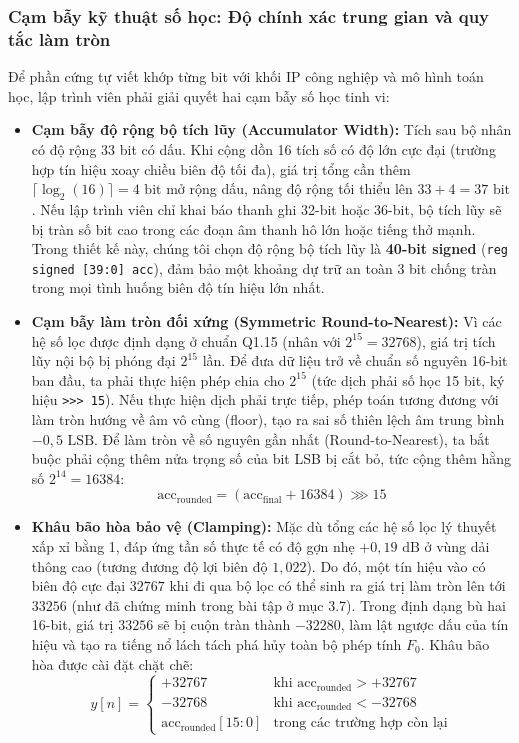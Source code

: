 \subsubsection*{Cạm bẫy kỹ thuật số học: Độ chính xác trung gian và quy tắc làm tròn}
Để phần cứng tự viết khớp từng bit với khối IP công nghiệp và mô hình toán học, lập trình viên phải giải quyết hai cạm bẫy số học tinh vi:
\begin{itemize}[leftmargin=1.5em, itemsep=3pt]
    \item \textbf{Cạm bẫy độ rộng bộ tích lũy (Accumulator Width):} 
    Tích sau bộ nhân có độ rộng 33 bit có dấu. Khi cộng dồn 16 tích số có độ lớn cực đại (trường hợp tín hiệu xoay chiều biên độ tối đa), giá trị tổng cần thêm $\lceil \log_2(16) \rceil = 4\text{ bit}$ mở rộng dấu, nâng độ rộng tối thiểu lên $33 + 4 = 37\text{ bit}$. Nếu lập trình viên chỉ khai báo thanh ghi 32-bit hoặc 36-bit, bộ tích lũy sẽ bị tràn số bit cao trong các đoạn âm thanh hô lớn hoặc tiếng thở mạnh. Trong thiết kế này, chúng tôi chọn độ rộng bộ tích lũy là \textbf{40-bit signed} (\texttt{reg signed [39:0] acc}), đảm bảo một khoảng dự trữ an toàn 3 bit chống tràn trong mọi tình huống biên độ tín hiệu lớn nhất.
    \item \textbf{Cạm bẫy làm tròn đối xứng (Symmetric Round-to-Nearest):}
    Vì các hệ số lọc được định dạng ở chuẩn Q1.15 (nhân với $2^{15} = 32768$), giá trị tích lũy nội bộ bị phóng đại $2^{15}$ lần. Để đưa dữ liệu trở về chuẩn số nguyên 16-bit ban đầu, ta phải thực hiện phép chia cho $2^{15}$ (tức dịch phải số học 15 bit, ký hiệu \texttt{>>> 15}).
    Nếu thực hiện dịch phải trực tiếp, phép toán tương đương với làm tròn hướng về âm vô cùng (floor), tạo ra sai số thiên lệch âm trung bình $-0{,}5\text{ LSB}$. Để làm tròn về số nguyên gần nhất (Round-to-Nearest), ta bắt buộc phải cộng thêm nửa trọng số của bit LSB bị cắt bỏ, tức cộng thêm hằng số $2^{14} = 16384$:
    \begin{equation}
    \text{acc}_{\text{rounded}} = (\text{acc}_{\text{final}} + 16384) \ggg 15
    \end{equation}
    \item \textbf{Khâu bão hòa bảo vệ (Clamping):}
    Mặc dù tổng các hệ số lọc lý thuyết xấp xỉ bằng 1, đáp ứng tần số thực tế có độ gợn nhẹ $+0{,}19\text{ dB}$ ở vùng dải thông cao (tương đương độ lợi biên độ $1{,}022$). Do đó, một tín hiệu vào có biên độ cực đại $32767$ khi đi qua bộ lọc có thể sinh ra giá trị làm tròn lên tới $33256$ (như đã chứng minh trong bài tập ở mục 3.7). Trong định dạng bù hai 16-bit, giá trị $33256$ sẽ bị cuộn tràn thành $-32280$, làm lật ngược dấu của tín hiệu và tạo ra tiếng nổ lách tách phá hủy toàn bộ phép tính $F_0$.
    Khâu bão hòa được cài đặt chặt chẽ:
    \begin{equation}
    y[n] = 
    \begin{cases}
    +32767 & \text{khi } \text{acc}_{\text{rounded}} > +32767 \\
    -32768 & \text{khi } \text{acc}_{\text{rounded}} < -32768 \\
    \text{acc}_{\text{rounded}}[15:0] & \text{trong các trường hợp còn lại}
    \end{cases}
    \end{equation}
\end{itemize}

